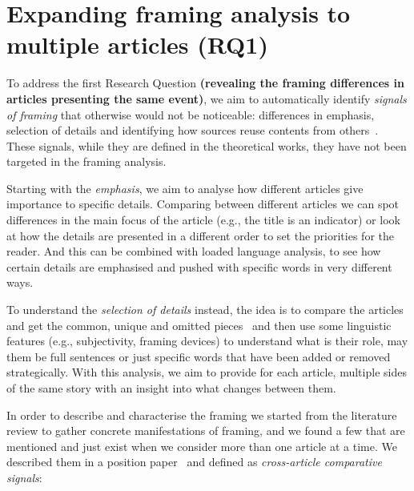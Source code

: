 \section{Expanding framing analysis to multiple articles (RQ1)}
\label{sec:prop_rq1}

To address the first Research Question \textbf{(revealing the framing differences in articles presenting the same event)}, we aim to automatically identify \textit{signals of framing} that otherwise would not be noticeable: %
differences in emphasis, selection of details and identifying how sources reuse contents from others~\cite{mensio2020towards}.
These signals, while they are defined in the theoretical works, they have not been targeted in the framing analysis.

Starting with the \textit{emphasis}, we aim to analyse how different articles give importance to specific details. Comparing between different articles we can spot differences in the main focus of the article (e.g., the title is an indicator) or look at how the details are presented in a different order to set the priorities for the reader.
And this can be combined with loaded language analysis, to see how certain details are emphasised and pushed with specific words in very different ways.

To understand the \textit{selection of details} instead, the idea is to compare the articles and get the common, unique and omitted pieces~\cite{bountouridis2018explaining} and then use some linguistic features (e.g., subjectivity, framing devices) to understand what is their role, may them be full sentences or just specific words that have been added or removed strategically.
With this analysis, we aim to provide for each article, multiple sides of the same story with an insight into what changes between them.

In order to describe and characterise the framing we started from the literature review to gather concrete manifestations of framing, and we found a few that are mentioned and just exist when we consider more than one article at a time.
We described them in a position paper~\cite{mensio2020towards} and defined as \emph{cross-article comparative signals}:

